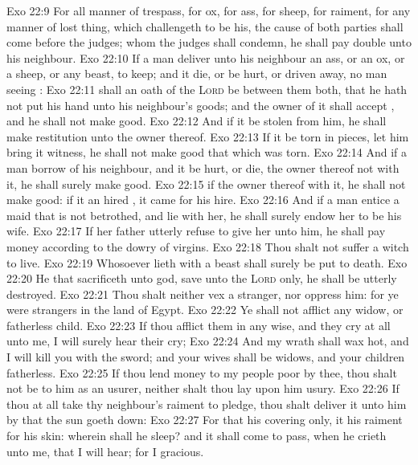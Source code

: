 \vs Exo 22:9 For all manner of trespass,  for ox, for ass, for sheep, for raiment,  for any manner of lost thing, which  challengeth to be his, the cause of both parties shall come before the judges;  whom the judges shall condemn, he shall pay double unto his neighbour.
\vs Exo 22:10 If a man deliver unto his neighbour an ass, or an ox, or a sheep, or any beast, to keep; and it die, or be hurt, or driven away, no man seeing :
\vs Exo 22:11  shall an oath of the \textsc{Lord} be between them both, that he hath not put his hand unto his neighbour's goods; and the owner of it shall accept , and he shall not make  good.
\vs Exo 22:12 And if it be stolen from him, he shall make restitution unto the owner thereof.
\vs Exo 22:13 If it be torn in pieces,  let him bring it  witness,  he shall not make good that which was torn.
\vs Exo 22:14 And if a man borrow  of his neighbour, and it be hurt, or die, the owner thereof  not with it, he shall surely make  good.
\vs Exo 22:15  if the owner thereof  with it, he shall not make  good: if it  an hired , it came for his hire.
\vs Exo 22:16 And if a man entice a maid that is not betrothed, and lie with her, he shall surely endow her to be his wife.
\vs Exo 22:17 If her father utterly refuse to give her unto him, he shall pay money according to the dowry of virgins.
\vs Exo 22:18 Thou shalt not suffer a witch to live.
\vs Exo 22:19 Whosoever lieth with a beast shall surely be put to death.
\vs Exo 22:20 He that sacrificeth unto  god, save unto the \textsc{Lord} only, he shall be utterly destroyed.
\vs Exo 22:21 Thou shalt neither vex a stranger, nor oppress him: for ye were strangers in the land of Egypt.
\vs Exo 22:22 Ye shall not afflict any widow, or fatherless child.
\vs Exo 22:23 If thou afflict them in any wise, and they cry at all unto me, I will surely hear their cry;
\vs Exo 22:24 And my wrath shall wax hot, and I will kill you with the sword; and your wives shall be widows, and your children fatherless.
\vs Exo 22:25 If thou lend money to  my people  poor by thee, thou shalt not be to him as an usurer, neither shalt thou lay upon him usury.
\vs Exo 22:26 If thou at all take thy neighbour's raiment to pledge, thou shalt deliver it unto him by that the sun goeth down:
\vs Exo 22:27 For that  his covering only, it  his raiment for his skin: wherein shall he sleep? and it shall come to pass, when he crieth unto me, that I will hear; for I  gracious.
